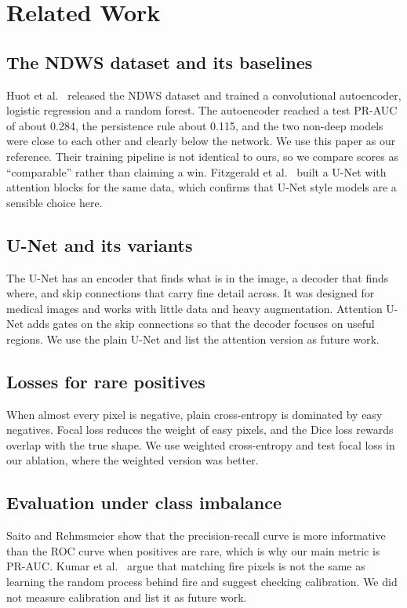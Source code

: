 \section{Related Work}
\subsection{The NDWS dataset and its baselines}
Huot et al.\ \cite{huot2022nextday} released the NDWS dataset and trained a convolutional autoencoder, logistic regression and a random forest. The autoencoder reached a test PR-AUC of about 0.284, the persistence rule about 0.115, and the two non-deep models were close to each other and clearly below the network. We use this paper as our reference. Their training pipeline is not identical to ours, so we compare scores as ``comparable'' rather than claiming a win. Fitzgerald et al.\ \cite{fitzgerald2023paying} built a U-Net with attention blocks for the same data, which confirms that U-Net style models are a sensible choice here.

\subsection{U-Net and its variants}
The U-Net \cite{ronneberger2015unet} has an encoder that finds what is in the image, a decoder that finds where, and skip connections that carry fine detail across. It was designed for medical images and works with little data and heavy augmentation. Attention U-Net \cite{oktay2018attention} adds gates on the skip connections so that the decoder focuses on useful regions. We use the plain U-Net and list the attention version as future work.

\subsection{Losses for rare positives}
When almost every pixel is negative, plain cross-entropy is dominated by easy negatives. Focal loss \cite{lin2017focal} reduces the weight of easy pixels, and the Dice loss \cite{milletari2016vnet} rewards overlap with the true shape. We use weighted cross-entropy and test focal loss in our ablation, where the weighted version was better.

\subsection{Evaluation under class imbalance}
Saito and Rehmsmeier \cite{saito2015precision} show that the precision-recall curve is more informative than the ROC curve when positives are rare, which is why our main metric is PR-AUC. Kumar et al.\ \cite{kumar2025stochastic} argue that matching fire pixels is not the same as learning the random process behind fire and suggest checking calibration. We did not measure calibration and list it as future work.


